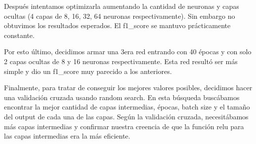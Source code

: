 \documentclass{article}
\begin{document}
Después intentamos optimizarla aumentando la cantidad de neuronas y capas ocultas (4 capas de 8, 16, 32, 64 neuronas respectivamente). Sin embargo no obtuvimos los resultados esperados. El f1\_score se mantuvo prácticamente constante.

Por esto último, decidimos armar una 3era red entrando con 40 épocas y con solo 2 capas ocultas de 8 y 16 neuronas respectivamente. Esta red resultó ser más simple y dio un f1\_score muy parecido a los anteriores. 

Finalmente, para tratar de conseguir los mejores valores posibles, decidimos hacer una validación cruzada usando random search. En esta búsqueda buscábamos encontrar la mejor cantidad de capas intermedias, épocas, batch size y el tamaño del output de cada una de las capas. Según la validación cruzada, necesitábamos más capas intermedias y confirmar nuestra creencia de que la función  relu para las capas intermedias era la más eficiente.
\end{document}
